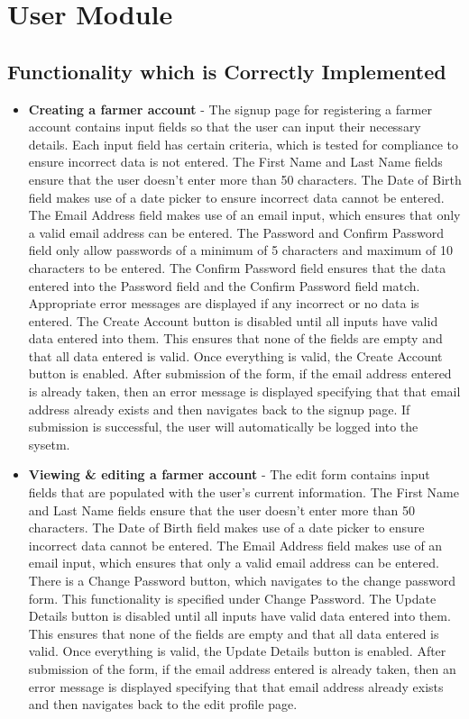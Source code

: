 \documentclass[11pt,fleqn]{book} %
\begin{document}

\chapter{User Module}
	\section{Functionality which is Correctly Implemented}
		\begin{itemize}
			\item\textbf{Creating a farmer account} -
			The signup page for registering a farmer account contains input fields so that the user can input their necessary details. Each input field has certain criteria, which is tested for compliance to ensure incorrect data is not entered. The First Name and Last Name fields ensure that the user doesn't enter more than 50 characters. The Date of Birth field makes use of a date picker to ensure incorrect data cannot be entered. The Email Address field makes use of an email input, which ensures that only a valid email address can be entered. The Password and Confirm Password field only allow passwords of a minimum of 5 characters and maximum of 10 characters to be entered. The Confirm Password field ensures that the data entered into the Password field and the Confirm Password field match. Appropriate error messages are displayed if any incorrect or no data is entered. The Create Account button is disabled until all inputs have valid data entered into them. This ensures that none of the fields are empty and that all data entered is valid. Once everything is valid, the Create Account button is enabled. After submission of the form, if the email address entered is already taken, then an error message is displayed specifying that that email address already exists and then navigates back to the signup page. If submission is successful, the user will automatically be logged into the sysetm.
			
			\item\textbf{Viewing \& editing a farmer account} - 
			The edit form contains input fields that are populated with the user's current information. The First Name and Last Name fields ensure that the user doesn't enter more than 50 characters. The Date of Birth field makes use of a date picker to ensure incorrect data cannot be entered. The Email Address field makes use of an email input, which ensures that only a valid email address can be entered. There is a Change Password button, which navigates to the change password form. This functionality is specified under Change Password. The Update Details button is disabled until all inputs have valid data entered into them. This ensures that none of the fields are empty and that all data entered is valid. Once everything is valid, the Update Details button is enabled. After submission of the form, if the email address entered is already taken, then an error message is displayed specifying that that email address already exists and then navigates back to the edit profile page.
			

\end{itemize}
\end{document}
